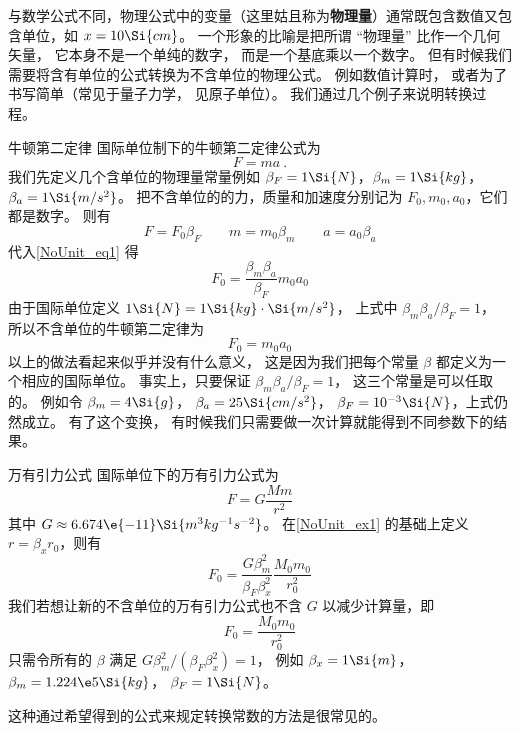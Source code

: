 

与数学公式不同，物理公式中的变量（这里姑且称为\textbf{物理量}）通常既包含数值又包含单位，如 $x = 10\Si{cm}$。 一个形象的比喻是把所谓 “物理量” 比作一个几何矢量， 它本身不是一个单纯的数字， 而是一个基底乘以一个数字。 但有时候我们需要将含有单位的公式转换为不含单位的物理公式。 例如数值计算时， 或者为了书写简单（常见于量子力学， 见原子单位）。 我们通过几个例子来说明转换过程。

\begin{example}{牛顿第二定律}\label{NoUnit_ex1}
国际单位制下的牛顿第二定律公式为
\begin{equation}\label{NoUnit_eq1}
F = ma~.
\end{equation}
我们先定义几个含单位的物理量常量例如 $\beta_{F} = 1\Si{N}$，$\beta_{m} = 1\Si{kg}$，$\beta_{a} = 1\Si{m/s^2}$。 把不含单位的的力，质量和加速度分别记为 $F_0, m_0, a_0$，它们都是数字。 则有
\begin{equation}
F = F_0 \beta_F \qquad
m = m_0 \beta_{m} \qquad
a = a_0 \beta_{a}
\end{equation}
代入\autoref{NoUnit_eq1} 得
\begin{equation}
F_0 = \frac{\beta_m \beta_a}{\beta_F} m_0  a_0
\end{equation}
由于国际单位定义 $1\Si{N} = 1\Si{kg}\cdot\Si{m/s^2}$， 上式中 $\beta_m \beta_a/\beta_F = 1$， 所以不含单位的牛顿第二定律为
\begin{equation}\label{NoUnit_eq3}
F_0 = m_0 a_0
\end{equation}
以上的做法看起来似乎并没有什么意义， 这是因为我们把每个常量 $\beta$ 都定义为一个相应的国际单位。 事实上，只要保证 $\beta_m \beta_a/\beta_F = 1$， 这三个常量是可以任取的。 例如令 $\beta_m = 4\Si{g}$， $\beta_a = 25\Si{cm/s^2}$， $\beta_F = 10^{-3}\Si{N}$，上式仍然成立。 有了这个变换， 有时候我们只需要做一次计算就能得到不同参数下的结果。
\end{example}

\begin{example}{万有引力公式}\label{NoUnit_ex2}
国际单位下的万有引力公式为
\begin{equation}
F = G\frac{Mm}{r^2}
\end{equation}
其中 $G \approx 6.674\e{-11} \Si{m^3 kg^{-1} s^{-2}}$。 在\autoref{NoUnit_ex1} 的基础上定义 $r = \beta_x r_0$，则有
\begin{equation}
F_0 = \frac{G\beta_m^2}{\beta_F \beta_x^2} \frac{M_0 m_0}{r_0^2}
\end{equation}
我们若想让新的不含单位的万有引力公式也不含 $G$ 以减少计算量，即
\begin{equation}\label{NoUnit_eq6}
F_0 = \frac{M_0 m_0}{r_0^2}
\end{equation}
只需令所有的 $\beta$ 满足 $G\beta_m^2/(\beta_F\beta_x^2) = 1$， 例如 $\beta_x = 1\Si{m}$， $\beta_m = 1.224\e5 \Si{kg}$， $\beta_F = 1\Si{N}$。
\end{example}
这种通过希望得到的公式来规定转换常数的方法是很常见的。

